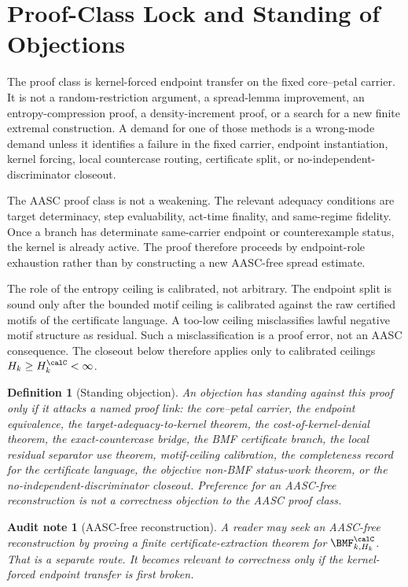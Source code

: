 \documentclass[11pt]{article}
\newtheorem{definition}[theorem]{Definition}
\newtheorem{audit}[theorem]{Audit note}
\begin{document}
\section{Proof-Class Lock and Standing of Objections}

The proof class is kernel-forced endpoint transfer on the fixed core--petal carrier.  It is not a random-restriction argument, a spread-lemma improvement, an entropy-compression proof, a density-increment proof, or a search for a new finite extremal construction.  A demand for one of those methods is a wrong-mode demand unless it identifies a failure in the fixed carrier, endpoint instantiation, kernel forcing, local countercase routing, certificate split, or no-independent-discriminator closeout.

The AASC proof class is not a weakening.  The relevant adequacy conditions are target determinacy, step evaluability, act-time finality, and same-regime fidelity.  Once a branch has determinate same-carrier endpoint or counterexample status, the kernel is already active.  The proof therefore proceeds by endpoint-role exhaustion rather than by constructing a new AASC-free spread estimate.

The role of the entropy ceiling is calibrated, not arbitrary.  The endpoint split is sound only after the bounded motif ceiling is calibrated against the raw certified motifs of the certificate language.  A too-low ceiling misclassifies lawful negative motif structure as residual.  Such a misclassification is a proof error, not an AASC consequence.  The closeout below therefore applies only to calibrated ceilings \(H_k\ge H_k^{\calC}<\infty\).

\begin{definition}[Standing objection]
An objection has standing against this proof only if it attacks a named proof link: the core--petal carrier, the endpoint equivalence, the target-adequacy-to-kernel theorem, the cost-of-kernel-denial theorem, the exact-countercase bridge, the BMF certificate branch, the local residual separator use theorem, motif-ceiling calibration, the completeness record for the certificate language, the objective non-BMF status-work theorem, or the no-independent-discriminator closeout.  Preference for an AASC-free reconstruction is not a correctness objection to the AASC proof class.
\end{definition}

\begin{audit}[AASC-free reconstruction]
A reader may seek an AASC-free reconstruction by proving a finite certificate-extraction theorem for \(\BMF^{\calC}_{k,H_k}\).  That is a separate route.  It becomes relevant to correctness only if the kernel-forced endpoint transfer is first broken.
\end{audit}
\end{document}
